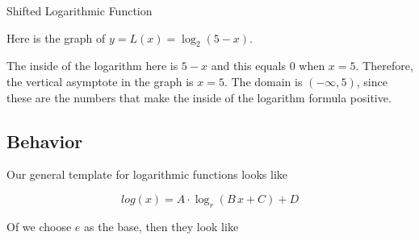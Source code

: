 \documentclass{ximera}
\begin{document}
\begin{example} Shifted Logarithmic Function



Here is the graph of $y = L(x) = \log_2(5-x)$.

\begin{image}
\end{image}




The inside of the logarithm here is $5-x$ and this equals $0$ when $x=5$.  Therefore, the vertical asymptote in the graph is $x=5$.  The domain is $(-\infty, 5)$, since these are the numbers that make the inside of the logarithm formula positive.





\end{example}











\subsection*{Behavior}







Our general template for logarithmic functions looks like

\[
log(x) = A \cdot \log_r(B \, x + C) + D
\]

Of we choose $e$ as the base, then they look like
\end{document}
